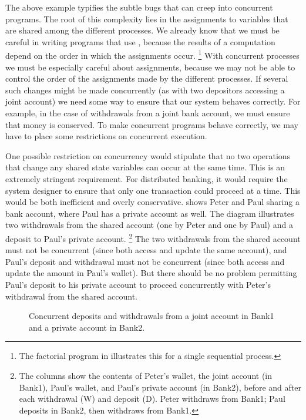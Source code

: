 The above example typifies the subtle bugs that can creep into concurrent programs.
The root of this complexity lies in the assignments to variables that are shared among the different processes.
We already know that we must be careful in writing programs that use , because the results of a computation depend on the order in which the assignments occur.%
\footnote{
	The factorial program in  illustrates this for a single sequential process.
}
With concurrent processes we must be especially careful about assignments, because we may not be able to control the order of the assignments made by the different processes.
If several such changes might be made concurrently (as with two depositors accessing a joint account) we need some way to ensure that our system behaves correctly.
For example, in the case of withdrawals from a joint bank account, we must ensure that money is conserved.
To make concurrent programs behave correctly, we may have to place some restrictions on concurrent execution.

One possible restriction on concurrency would stipulate that no two operations that change any shared state variables can occur at the same time.
This is an extremely stringent requirement.
For distributed banking, it would require the system designer to ensure that only one transaction could proceed at a time.
This would be both inefficient and overly conservative.
 shows Peter and Paul sharing a bank account, where Paul has a private account as well.
The diagram illustrates two withdrawals from the shared account (one by Peter and one by Paul) and a deposit to Paul’s private account.%
\footnote{
	The columns show the contents of Peter’s wallet, the joint account (in Bank1), Paul’s wallet, and Paul’s private account (in Bank2), before and after each withdrawal (W) and deposit (D).
	Peter withdraws  from Bank1;
	Paul deposits  in Bank2, then withdraws  from Bank1.
}
The two withdrawals from the shared account must not be concurrent (since both access and update the same account), and Paul’s deposit and withdrawal must not be concurrent (since both access and update the amount in Paul’s wallet).
But there should be no problem permitting Paul’s deposit to his private account to proceed concurrently with Peter’s withdrawal from the shared account.

\begin{figure}[tb]
	\centering
	
	\caption{
		Concurrent deposits and withdrawals from a joint account in Bank1 and a private account in Bank2.
	}
	\label{Figure 3.30}
\end{figure}

